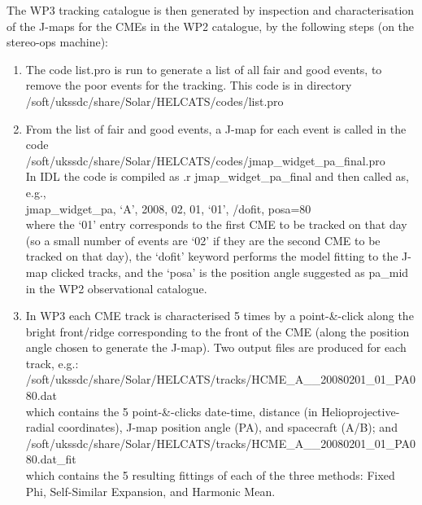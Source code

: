 \documentclass[12pt, a4paper, oneside]{article}
\begin{document}
The WP3 tracking catalogue is then generated by inspection and characterisation of the J-maps for the CMEs in the WP2 catalogue, by the following steps (on the stereo-ops machine):

\begin{enumerate}

\item The code list.pro is run to generate a list of all fair and good events, to remove the poor events for the tracking. This code is in directory\\
/soft/ukssdc/share/Solar/HELCATS/codes/list.pro\\

\item From the list of fair and good events, a J-map for each event is called in the code\\
/soft/ukssdc/share/Solar/HELCATS/codes/jmap\_widget\_pa\_final.pro\\
In IDL the code is compiled as .r jmap\_widget\_pa\_final and then called as, e.g.,\\
jmap\_widget\_pa, `A', 2008, 02, 01, `01', /dofit, posa=80 \\
where the `01' entry corresponds to the first CME to be tracked on that day (so a small number of events are `02' if they are the second CME to be tracked on that day), the `dofit' keyword performs the model fitting to the J-map clicked tracks, and the `posa' is the position angle suggested as pa\_mid in the WP2 observational catalogue.

\item In WP3 each CME track is characterised 5 times by a point-\&-click along the bright front/ridge corresponding to the front of the CME (along the position angle chosen to generate the J-map). Two output files are produced for each track, e.g.: \\
/soft/ukssdc/share/Solar/HELCATS/tracks/HCME\_A\_\_20080201\_01\_PA080.dat \\
which contains the 5 point-\&-clicks date-time, distance (in Helioprojective-radial coordinates), J-map position angle (PA), and spacecraft (A/B); and\\
/soft/ukssdc/share/Solar/HELCATS/tracks/HCME\_A\_\_20080201\_01\_PA080.dat\_fit \\
which contains the 5 resulting fittings of each of the three methods: Fixed Phi, Self-Similar Expansion, and Harmonic Mean.

\end{enumerate}
\end{document}
